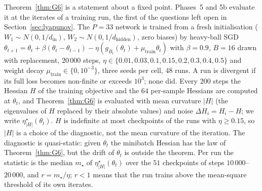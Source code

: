 \documentclass[11pt]{article}
\theoremstyle{remark}
\begin{document}
Theorem~\ref{thm:G6} is a statement about a fixed point. Phases~5 and 5b evaluate it at the iterates of a training run, the first of the questions left open in Section~\ref{sec:lyapunov}. The $P=33$ network is trained from a fresh initialisation ($W_1\sim N(0,1/d_{\mathrm{in}})$, $W_2\sim N(0,1/d_{\mathrm{hidden}})$, zero biases) by heavy-ball SGD $\theta_{t+1}=\theta_t+\beta(\theta_t-\theta_{t-1})-\eta(g_{B_t}(\theta_t)+\mu_{\mathrm{train}}\theta_t)$ with $\beta=0.9$, $B=16$ drawn with replacement, $20\,000$ steps, $\eta\in\{0.01,0.03,0.1,0.15,0.2,0.3,0.4,0.5\}$ and weight decay $\mu_{\mathrm{train}}\in\{0,10^{-3}\}$, three seeds per cell, 48 runs. A run is divergent if its full loss becomes non-finite or exceeds $10^3$; none did. Every $200$ steps the Hessian $H$ of the training objective and the $64$ per-sample Hessians are computed at $\theta_t$, and Theorem~\ref{thm:G6} is evaluated with mean curvature $|H|$ (the eigenvalues of $H$ replaced by their absolute values) and noise $\Delta H_i=H_i-H$; we write $\eta^\star_{|H|}(\theta_t)$. $H$ is indefinite at most checkpoints of the runs with $\eta\ge0.15$, so $|H|$ is a choice of the diagnostic, not the mean curvature of the iteration. The diagnostic is quasi-static: given $\theta_t$ the minibatch Hessian has the law of Theorem~\ref{thm:G6}, but the drift of $\theta_t$ is outside the theorem. Per run the statistic is the median $m_\star$ of $\eta^\star_{|H|}(\theta_t)$ over the $51$ checkpoints of steps $10\,000$--$20\,000$, and $r=m_\star/\eta$; $r<1$ means that the run trains above the mean-square threshold of its own iterates.
\end{document}
